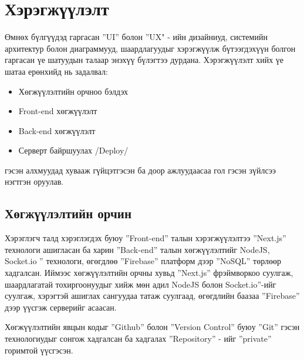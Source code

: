\chapter{Хэрэгжүүлэлт}

Өмнөх бүлгүүдэд гаргасан ”UI”  болон ”UX" - ийн дизайниуд, системийн архитектур болон диаграммууд, шаардлагуудыг хэрэгжүүлж бүтээгдэхүүн болгон гаргасан үе шатуудын талаар энэхүү бүлэгтээ дурдана.
Хэрэгжүүлэлт хийх үе шатаа ерөнхийд нь задалвал:

\begin{itemize}
	\item Хөгжүүлэлтийн орчноо бэлдэх
	\item Front-end хөгжүүлэлт
	\item Back-end хөгжүүлэлт
	\item Серверт байршуулах /Deploy/
\end{itemize}

гэсэн алхмуудад хувааж гүйцэтгэсэн ба доор ажлуудаасаа гол гэсэн зүйлсээ нэгтгэн оруулав.

\section{Хөгжүүлэлтийн орчин}

Хэрэглэгч талд хэрэглэгдэх буюу ”Front-end” талын хэрэгжүүлэлтээ ”Next.js” технологи ашигласан ба харин ”Back-end” талын хөгжүүлэлтийг NodeJS, Socket.io ” технологи, өгөгдлөө ”Firebase” платформ дээр ”NoSQL” төрлөөр хадгалсан. Иймээс хөгжүүлэлтийн орчны хувьд ”Next.js” фрэймворкоо суулгаж, шаардлагатай тохиргоонуудыг хийж мөн адил NodeJS болон Socket.io”-ийг суулгаж, хэрэгтэй ашиглах сангуудаа татаж суулгаад, өгөгдлийн баазаа ”Firebase” дээр үүсгэж серверийг асаасан.

Хөгжүүлэлтийн явцын кодыг ”Github” болон ”Version Control” буюу ”Git” гэсэн технологиудыг сонгож хадгалсан ба хадгалах ”Repository” - ийг ”private” горимтой үүсгэсэн.

